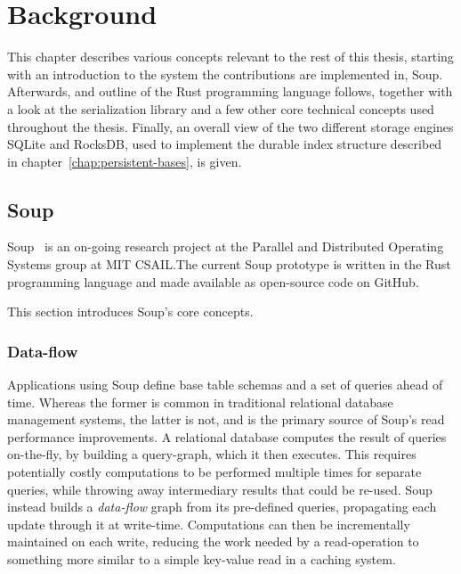 \chapter{Background}\label{chap:background}

This chapter describes various concepts relevant to the rest of this thesis,
starting with an introduction to the system the contributions are implemented
in, Soup. Afterwards, and outline of the Rust programming language follows,
together with a look at the  serialization library and a few other
core technical concepts used throughout the thesis. Finally, an overall view of
the two different storage engines SQLite and RocksDB, used to implement the
durable index structure described in chapter~\ref{chap:persistent-bases}, is
given.

\newpage

\section{Soup}

Soup~\cite{xylem} is an on-going research project at the Parallel and Distributed Operating
Systems group at MIT CSAIL.\@ The current Soup
prototype is written in the Rust programming language and made available as
open-source code on GitHub.

This section introduces Soup's core concepts.

\subsection{Data-flow}

Applications using Soup define base table schemas and a set of queries ahead of
time. Whereas the former is common in traditional relational database management
systems, the latter is not, and is the primary source of Soup's read performance
improvements. A relational database computes the result of queries on-the-fly,
by building a query-graph, which it then executes. This requires potentially
costly computations to be performed multiple times for separate queries, while
throwing away intermediary results that could be re-used. Soup instead builds a
\textit{data-flow} graph from its pre-defined queries, propagating each update
through it at write-time. Computations can then be incrementally maintained on
each write, reducing the work needed by a read-operation to something more
similar to a simple key-value read in a caching system.


